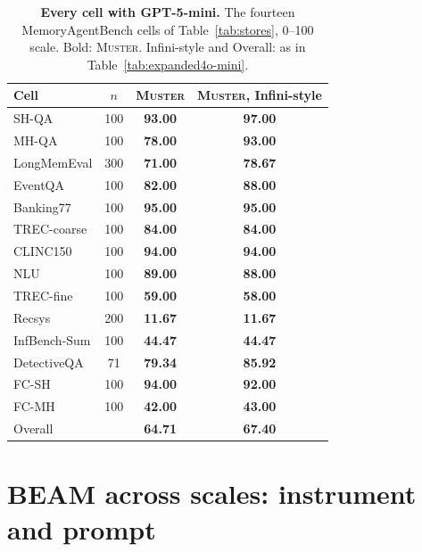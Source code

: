 \documentclass{article}
\newcommand{\tabfont}{\fontsize{7.5}{8.5}\selectfont\renewcommand{\arraystretch}{1.0}}
\newcommand{\sys}{\textsc{Muster}}
\begin{document}
\begin{table}[!htbp]
\centering\tabfont
\caption{\textbf{Every cell with GPT-5-mini.} The fourteen MemoryAgentBench cells of Table~\ref{tab:stores}, 0--100 scale. Bold: \sys{}. Infini-style and Overall: as in Table~\ref{tab:expanded4o-mini}.}
\label{tab:expanded5-mini}
\setlength{\tabcolsep}{4pt}\setlength{\aboverulesep}{0pt}\setlength{\belowrulesep}{0pt}\setlength{\extrarowheight}{0.8pt}
\begin{tabular}{lc>{\columncolor{oursbg}}c>{\columncolor{oursbg}}c}
\toprule
Cell & $n$ & \textbf{\sys{}} & \textbf{\sys{}, Infini-style} \\
\midrule
SH-QA & 100 & \textbf{93.00} & \textbf{97.00} \\
MH-QA & 100 & \textbf{78.00} & \textbf{93.00} \\
LongMemEval & 300 & \textbf{71.00} & \textbf{78.67} \\
EventQA & 100 & \textbf{82.00} & \textbf{88.00} \\
Banking77 & 100 & \textbf{95.00} & \textbf{95.00} \\
TREC-coarse & 100 & \textbf{84.00} & \textbf{84.00} \\
CLINC150 & 100 & \textbf{94.00} & \textbf{94.00} \\
NLU & 100 & \textbf{89.00} & \textbf{88.00} \\
TREC-fine & 100 & \textbf{59.00} & \textbf{58.00} \\
Recsys & 200 & \textbf{11.67} & \textbf{11.67} \\
InfBench-Sum & 100 & \textbf{44.47} & \textbf{44.47} \\
DetectiveQA & 71 & \textbf{79.34} & \textbf{85.92} \\
FC-SH & 100 & \textbf{94.00} & \textbf{92.00} \\
FC-MH & 100 & \textbf{42.00} & \textbf{43.00} \\
\midrule
Overall &  & \textbf{64.71} & \textbf{67.40} \\
\bottomrule
\end{tabular}
\end{table}

\FloatBarrier
\section{BEAM across scales: instrument and prompt}\label{app:beamscale}
\end{document}
